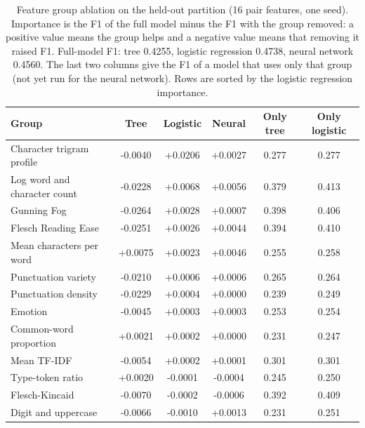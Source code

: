 \documentclass[runningheads]{llncs}
\newcommand{\tablefont}{\scriptsize\setlength{\tabcolsep}{3pt}}
\begin{document}
\begin{table}[t]
\centering
\caption{Feature group ablation on the held-out partition (16 pair features, one seed). Importance is the F1 of the full model minus the F1 with the group removed: a positive value means the group helps and a negative value means that removing it raised F1. Full-model F1: tree 0.4255, logistic regression 0.4738, neural network 0.4560. The last two columns give the F1 of a model that uses only that group (not yet run for the neural network). Rows are sorted by the logistic regression importance.}
\label{tab:ablation}
\tablefont
\begin{tabular}{lccccc}
\toprule
\textbf{Group} & \textbf{Tree} & \textbf{Logistic} & \textbf{Neural} & \textbf{Only tree} & \textbf{Only logistic} \\
\midrule
Character trigram profile & -0.0040 & +0.0206 & +0.0027 & 0.277 & 0.277 \\
Log word and character count & -0.0228 & +0.0068 & +0.0056 & 0.379 & 0.413 \\
Gunning Fog & -0.0264 & +0.0028 & +0.0007 & 0.398 & 0.406 \\
Flesch Reading Ease & -0.0251 & +0.0026 & +0.0044 & 0.394 & 0.410 \\
Mean characters per word & +0.0075 & +0.0023 & +0.0046 & 0.255 & 0.258 \\
Punctuation variety & -0.0210 & +0.0006 & +0.0006 & 0.265 & 0.264 \\
Punctuation density & -0.0229 & +0.0004 & +0.0000 & 0.239 & 0.249 \\
Emotion & -0.0045 & +0.0003 & +0.0003 & 0.253 & 0.254 \\
Common-word proportion & +0.0021 & +0.0002 & +0.0000 & 0.231 & 0.247 \\
Mean TF-IDF & -0.0054 & +0.0002 & +0.0001 & 0.301 & 0.301 \\
Type-token ratio & +0.0020 & -0.0001 & -0.0004 & 0.245 & 0.250 \\
Flesch-Kincaid & -0.0070 & -0.0002 & -0.0006 & 0.392 & 0.409 \\
Digit and uppercase & -0.0066 & -0.0010 & +0.0013 & 0.231 & 0.251 \\
\bottomrule
\end{tabular}
\end{table}
\end{document}
